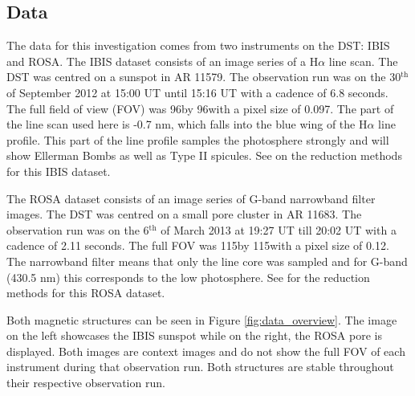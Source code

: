     \subsection{Data}
    
    The data for this investigation comes from two instruments on the DST: IBIS and ROSA.
    The IBIS dataset consists of an image series of a H$\alpha$ line scan.
    The DST was centred on a sunspot in AR 11579.
    The observation run was on the 30$^{\mathrm{th}}$ of September 2012 at 15:00 UT until 15:16 UT with a cadence of 6.8 seconds.
    The full field of view (FOV) was 96\arcsecs by 96\arcsecs with a pixel size of 0.097\arcsecs.
    The part of the line scan used here is -0.7 nm, which falls into the blue wing of the H$\alpha$ line profile.
    This part of the line profile samples the photosphere strongly and will show Ellerman Bombs as well as Type II spicules.
    See \cite{2013A&A...560A..31N} on the reduction methods for this IBIS dataset.

    The ROSA dataset consists of an image series of G-band narrowband filter images.
    The DST was centred on a small pore cluster in AR 11683.
    The observation run was on the 6$^{\mathrm{th}}$ of March 2013 at 19:27 UT till 20:02 UT with a cadence of 2.11 seconds.
    The full FOV was 115\arcsecs by 115\arcsecs with a pixel size of 0.12\arcsecs.
    The narrowband filter means that only the line core was sampled and for G-band (430.5 nm) this corresponds to the low photosphere.
    See \cite{0004-637X-806-1-132} for the reduction methods for this ROSA dataset.
    
    Both magnetic structures can be seen in Figure \ref{fig:data_overview}.
    The image on the left showcases the  IBIS sunspot while on the right, the ROSA pore is displayed.
    Both images are context images and do not show the full FOV of each instrument during that observation run.
    Both structures are stable throughout their respective observation run.

